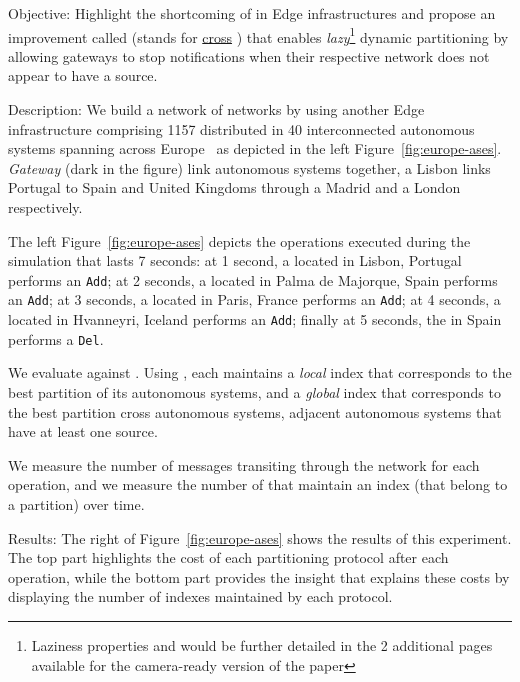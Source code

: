 \begin{asparadesc}
  \item[Objective:] Highlight the shortcoming of \NAME in Edge
    infrastructures and propose an improvement called \NAMEC (stands
    for \underline{cross} \underline{\NAME}) that enables
    \emph{lazy}\footnote{Laziness properties and \NAMEC would be
    further detailed in the 2 additional pages available for the
    camera-ready version of the paper} dynamic partitioning by
    allowing gateways to stop notifications when their respective
    network does not appear to have a source.
    
  \item[Description:] We build a network of networks by using another
    Edge infrastructure comprising 1157 \processes distributed in 40
    interconnected autonomous systems spanning across
    Europe~\cite{knight2011internet} as depicted in the left
    Figure~\ref{fig:europe-ases}. \emph{Gateway} \processes (dark in
    the figure) link autonomous systems together, \eg a Lisbon \node
    links Portugal to Spain and United Kingdoms through a Madrid \node
    and a London \node respectively.

    \noindent The left Figure~\ref{fig:europe-ases} depicts the
    operations executed during the simulation that lasts 7 seconds: at
    1 second, a \node located in Lisbon, Portugal performs an
    \texttt{Add}; at 2 seconds, a \node located in Palma de Majorque,
    Spain performs an \texttt{Add}; at 3 seconds, a \node located in
    Paris, France performs an \texttt{Add}; at 4 seconds, a \node
    located in Hvanneyri, Iceland performs an \texttt{Add};
    finally at 5 seconds, the \node in Spain performs a \texttt{Del}.
    
    \noindent We evaluate \NAME against \NAMEC. Using \NAMEC, each
    \process maintains a \emph{local} index that corresponds to the
    best partition of its autonomous systems, and a \emph{global}
    index that corresponds to the best partition cross autonomous
    systems, \ie adjacent autonomous systems that have at least one
    source.
    
    \noindent We measure the number of messages transiting through the
    network for each operation, and we measure the number of
    \processes that maintain an index (\ie that belong to a partition)
    over time.
    
  \item[Results:] The right of Figure~\ref{fig:europe-ases} shows the
    results of this experiment. The top part highlights the cost of
    each partitioning protocol after each operation, while the bottom
    part provides the insight that explains these costs by displaying
    the number of indexes maintained by each protocol.


\end{asparadesc}
